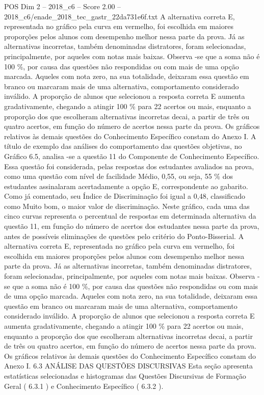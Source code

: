 \begin{textsample}{POS Dim 2 – 2018\_c6 – Score 2.00 – 2018\_c6/enade\_2018\_tec\_gastr\_22da731e6f.txt}
A alternativa correta E, representada no gráfico pela curva em vermelho, foi escolhida em maiores proporções pelos alunos com desempenho melhor nessa parte da prova.
Já as alternativas incorretas, também denominadas distratores, foram selecionadas, principalmente, por aqueles com notas mais baixas.
Observa -se que a soma não é 100 \%, por causa das questões não respondidas ou com mais de uma opção marcada.
Aqueles com nota zero, na sua totalidade, deixaram essa questão em branco ou marcaram mais de uma alternativa, comportamento considerado inválido.
A proporção de alunos que selecionou a resposta correta E aumenta gradativamente, chegando a atingir 100 \% para 22 acertos ou mais, enquanto a proporção dos que escolheram alternativas incorretas decai, a partir de três ou quatro acertos, em função do número de acertos nessa parte da prova.
Os gráficos relativos às demais questões do Conhecimento Específico constam do Anexo I.
A título de exemplo das análises do comportamento das questões objetivas, no Gráfico 6.5, analisa -se a questão 11 do Componente de Conhecimento Específico.
Essa questão foi considerada, pelas respostas dos estudantes avaliados na prova, como uma questão com nível de facilidade Médio, 0,55, ou seja, 55 \% dos estudantes assinalaram acertadamente a opção E, correspondente ao gabarito.
Como já comentado, seu Índice de Discriminação foi igual a 0,48, classificado como Muito bom, o maior valor de discriminação.
Neste gráfico, cada uma das cinco curvas representa o percentual de respostas em determinada alternativa da questão 11, em função do número de acertos dos estudantes nessa parte da prova, antes de possíveis eliminações de questões pelo critério do Ponto-Bisserial.
A alternativa correta E, representada no gráfico pela curva em vermelho, foi escolhida em maiores proporções pelos alunos com desempenho melhor nessa parte da prova.
Já as alternativas incorretas, também denominadas distratores, foram selecionadas, principalmente, por aqueles com notas mais baixas.
Observa -se que a soma não é 100 \%, por causa das questões não respondidas ou com mais de uma opção marcada.
Aqueles com nota zero, na sua totalidade, deixaram essa questão em branco ou marcaram mais de uma alternativa, comportamento considerado inválido.
A proporção de alunos que selecionou a resposta correta E aumenta gradativamente, chegando a atingir 100 \% para 22 acertos ou mais, enquanto a proporção dos que escolheram alternativas incorretas decai, a partir de três ou quatro acertos, em função do número de acertos nessa parte da prova.
Os gráficos relativos às demais questões do Conhecimento Específico constam do Anexo I. 6.3 ANÁLISE DAS QUESTÕES DISCURSIVAS Esta seção apresenta estatísticas selecionadas e histogramas das Questões Discursivas de Formação Geral ( 6.3.1 ) e Conhecimento Específico ( 6.3.2 ).

\end{textsample}
